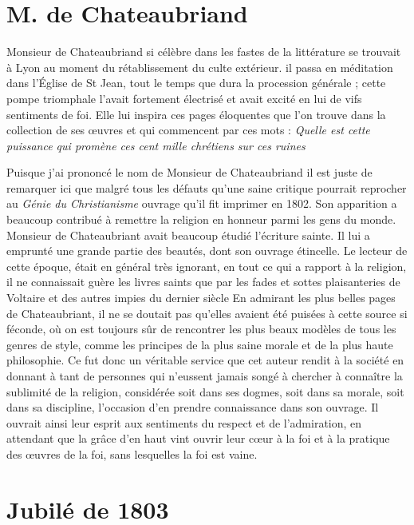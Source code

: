 \documentclass[11pt,a4paper]{report}
\begin{document}
\section*{M. de Chateaubriand}

Monsieur de Chateaubriand si célèbre dans les fastes de la littérature se trouvait à Lyon au moment du rétablissement du culte extérieur. il passa en méditation dans l'Église de St Jean, tout le temps que dura la procession générale ; cette pompe triomphale l'avait fortement électrisé et avait excité en lui de vifs sentiments de foi. Elle lui inspira ces pages éloquentes que l'on trouve dans la collection de ses œuvres et qui commencent par ces mots : \textit{Quelle est cette puissance qui promène ces cent mille chrétiens sur ces ruines}

Puisque j'ai prononcé le nom de Monsieur de Chateaubriand il est juste de remarquer ici que malgré tous les défauts qu'une saine critique pourrait reprocher au \textit{Génie du Christianisme} ouvrage qu'il fit imprimer en 1802. Son apparition a beaucoup contribué à remettre la religion en honneur parmi les gens du monde. Monsieur de Chateaubriant avait beaucoup étudié l'écriture sainte. Il lui a emprunté une grande partie des beautés, dont son ouvrage étincelle. Le lecteur de cette époque, était en général très ignorant, en tout ce qui a rapport à la religion, il ne connaissait guère les livres saints que par les fades et sottes plaisanteries de Voltaire et des autres impies du dernier siècle En admirant les plus belles pages de Chateaubriant, il ne se doutait pas qu'elles avaient été puisées à cette source si féconde, où on est toujours sûr de rencontrer les plus beaux modèles de tous les genres de style, comme les principes de la plus saine morale et de la plus haute philosophie. Ce fut donc un véritable service que cet auteur rendit à la société en donnant à tant de personnes qui n'eussent jamais songé à chercher à connaître la sublimité de la religion, considérée soit dans ses dogmes, soit dans sa morale, soit dans sa discipline, l'occasion d'en prendre connaissance dans son ouvrage. Il ouvrait ainsi leur esprit aux sentiments du respect et de l'admiration, en attendant que la grâce d'en haut vint ouvrir leur cœur à la foi et à la pratique des œuvres de la foi, sans lesquelles la foi est vaine.

\section*{Jubilé de 1803}
\end{document}
